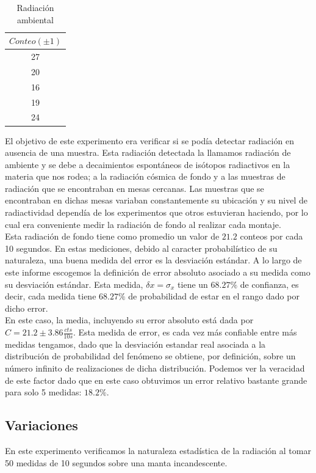 \documentclass[%
 reprint,
 amsmath,amssymb,
 aps,
]{revtex4-1}
\begin{document}
\begin{table}[h!]
\centering
\begin{tabular}{|c|}
	\hline $ Conteo (\pm 1) $ \\ 
	\hline\hline
	27\\
	20\\
	16\\
	19\\
	24\\
	[1ex] 
 \hline
 \end{tabular} 
  \caption{Radiación ambiental}
\label{table:fondo} 
\end{table}

El objetivo de este experimento era verificar si se podía detectar radiación en ausencia de una muestra. Esta radiación detectada la llamamos radiación de ambiente y se debe a decaimientos espontáneos de isótopos radiactivos en la materia que nos rodea; a la radiación cósmica de fondo y a las muestras de radiación que se encontraban en mesas cercanas. Las muestras que se encontraban en dichas mesas variaban constantemente su ubicación y su nivel de radiactividad dependía de los experimentos que otros estuvieran haciendo, por lo cual era conveniente medir la radiación de fondo al realizar cada montaje.\\

Esta radiación de fondo tiene como promedio un valor de $21.2$ conteos por cada 10 segundos. En estas mediciones, debido al caracter probabilístico de su naturaleza, una buena medida del error es la desviación estándar. A lo largo de este informe escogemos la definición de error absoluto asociado a su medida como su desviación estándar. Esta medida, $\delta x = \sigma_x$ tiene un $68.27\%$ de confianza, es decir, cada medida tiene  $68.27\%$ de probabilidad de estar en el rango dado por dicho error. \\

En este caso, la media, incluyendo su error absoluto está dada por $C = 21.2 \pm 3.86\frac{cts}{10s}$. Esta medida de error, es cada vez más confiable entre más medidas tengamos, dado que la desviación estandar real asociada a la distribución de probabilidad del fenómeno se obtiene, por definición, sobre un número infinito de realizaciones de dicha distribución. Podemos ver la veracidad de este factor dado que en este caso obtuvimos un error relativo bastante grande para solo 5 medidas: $18.2\%$.\\

\subsection{\label{sec:level2}Variaciones} 
En este experimento verificamos la naturaleza estadística de la radiación al tomar 50 medidas de 10 segundos sobre una manta incandescente.\\
\end{document}
